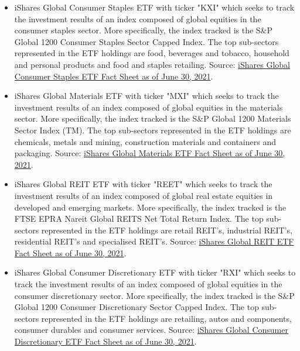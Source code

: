 \begin{itemize}
        \item iShares Global Consumer Staples ETF with ticker "KXI" which seeks to track the investment results of an index composed of global equities in the consumer staples sector. More specifically, the index tracked is the S{\&}P Global 1200 Consumer Staples Sector Capped Index. The top sub-sectors represented in the ETF holdings are food, beverages and tobacco, household and personal products and food and staples retailing. Source: \href{https://www.ishares.com/us/literature/fact-sheet/kxi-ishares-global-consumer-staples-etf-fund-fact-sheet-en-us.pdf}{iShares Global Consumer Staples ETF Fact Sheet as of June 30, 2021}.%
        
        \item iShares Global Materials ETF with ticker "MXI" which seeks to track the investment results of an index composed of global equities in the materials sector. More specifically, the index tracked is the S{\&}P Global 1200 Materials Sector Index (TM). The top sub-sectors represented in the ETF holdings are chemicals, metals and mining, construction materials and containers and packaging. Source: \href{https://www.ishares.com/us/literature/fact-sheet/mxi-ishares-global-materials-etf-fund-fact-sheet-en-us.pdf}{iShares Global Materials ETF Fact Sheet as of June 30, 2021}.%
       
        \item iShares Global REIT ETF with ticker "REET" which seeks to track the investment results of an index composed of global real estate equities in developed and emerging markets. More specifically, the index tracked is the FTSE EPRA Nareit Global REITS Net Total Return Index. The top sub-sectors represented in the ETF holdings are retail REIT's, industrial REIT's, residential REIT's and specialised REIT's. Source: \href{https://www.ishares.com/us/literature/fact-sheet/reet-ishares-global-reit-etf-fund-fact-sheet-en-us.pdf}{iShares Global REIT ETF Fact Sheet as of June 30, 2021}.%
        
        \item iShares Global Consumer Discretionary ETF with ticker "RXI" which seeks to track the investment results of an index composed of global equities in the consumer discretionary sector. More specifically, the index tracked is the S{\&}P Global 1200 Consumer Discretionary Sector Capped Index. The top sub-sectors represented in the ETF holdings are retailing, autos and components, consumer durables and consumer services. Source: \href{https://www.ishares.com/us/literature/fact-sheet/rxi-ishares-global-consumer-discretionary-etf-fund-fact-sheet-en-us.pdf}{iShares Global Consumer Discretionary ETF Fact Sheet as of June 30, 2021}.%
    \end{itemize}
    
